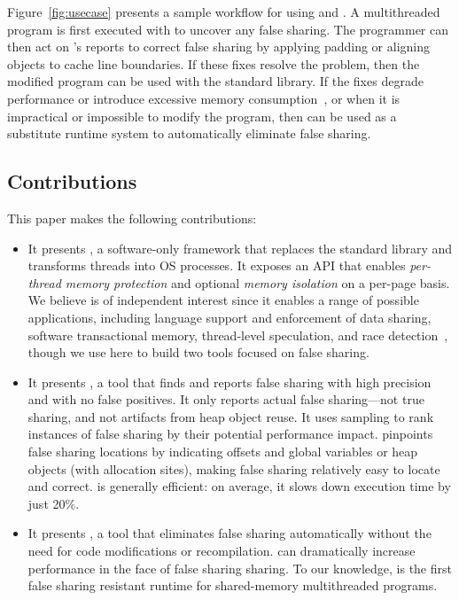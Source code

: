Figure~\ref{fig:usecase} presents a sample workflow for
using \sheriffdetect{} and \sheriffprotect{}. A multithreaded program
is first executed with \sheriffdetect{} to uncover any false
sharing. The programmer can then act on \sheriffdetect{}'s reports to
correct false sharing by applying padding or aligning objects to cache
line boundaries. If these fixes resolve the problem, then the modified
program can be used with the standard \pthreads{} library. If the
fixes degrade performance or introduce excessive memory
consumption~\cite{zhao:vee:2011}, or when it is impractical or
impossible to modify the program, then \sheriffprotect{} can be used
as a substitute runtime system to automatically eliminate false
sharing.

\subsection*{Contributions}

This paper makes the following contributions:

\begin{itemize}

\item It presents {\bf \sheriff{}}, a software-only framework that replaces
the standard \pthreads{} library and transforms threads into OS
processes. It exposes an API that enables \emph{per-thread memory
protection} and optional \emph{memory isolation} on a per-page
basis. We believe \sheriff{} is of independent interest since it
enables a range of possible applications, including language support
and enforcement of data sharing, software transactional memory,
thread-level speculation, and race detection~\cite{mammoths}, though
we use \sheriff{} here to build two tools focused on false sharing.

\item It presents {\bf \sheriffdetect{}}, a tool that finds and reports false
sharing with high precision and with no false positives. It only
reports actual false sharing---not true sharing, and not artifacts
from heap object reuse. It uses sampling to rank instances of false sharing by
their potential performance impact. \sheriffdetect{} pinpoints false
sharing locations by indicating offsets and global variables or heap
objects (with allocation sites), making false sharing relatively easy
to locate and correct. \sheriffdetect{} is generally efficient: on average, it
slows down execution time by just 20\%.

\item It presents {\bf \sheriffprotect{}}, a tool that eliminates false sharing
automatically without the need for code modifications or
recompilation. \sheriffprotect{} can dramatically increase performance
in the face of false sharing sharing. To our knowledge, \sheriffprotect{} is
the first false sharing resistant runtime for shared-memory
multithreaded programs.

\end{itemize}


